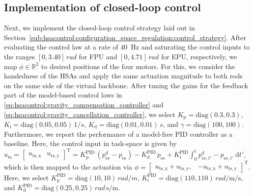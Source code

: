 \subsection{Implementation of closed-loop control}
Next, we implement the closed-loop control strategy laid out in Section~\ref{sub:hsacontrol:configuration_space_regulation:control_strategy}.
After evaluating the control law at a rate of \SI{40}{Hz} and saturating the control inputs to the ranges $[0, 3.40] \, \si{rad}$ for FPU and $[0, 4.71] \, \si{rad}$ for EPU, respectively, we map $\phi \in \mathbb{R}^2$ to desired positions of the four motors. For this, we consider the handedness of the \glspl{HSA} and apply the same actuation magnitude to both rods on the same side of the virtual backbone.
After tuning the gains for the feedback part of the model-based control laws in \eqref{eq:hsacontrol:gravity_compensation_controller} and \eqref{eq:hsacontrol:gravity_cancellation_controller}, we select $K_\mathrm{p} = \mathrm{diag}(0.3, 0.3)$, $K_\mathrm{i} = \mathrm{diag}(0.05, 0.05) \, \si{1 \per s}$, $K_\mathrm{d} = \mathrm{diag}(0.01, 0.01) \, \si{s}$, and $\gamma = \mathrm{diag}(100, 100)$. 
Furthermore, we report the performance of a model-free PID controller as a baseline. Here, the control input in task-space is given by $u_\mathrm{ts} = \begin{bmatrix}u_\mathrm{ts,x} & u_\mathrm{ts,y}\end{bmatrix}^\mathrm{T} = K_\mathrm{p}^\mathrm{PID} \, (p_\mathrm{ee}^\mathrm{d}-p_\mathrm{ee}) - K_\mathrm{d}^\mathrm{PID} \, \dot{p}_\mathrm{ee} + K_\mathrm{i}^\mathrm{PID} \int_0^t p_{\mathrm{ee},t'}^\mathrm{d} - p_{\mathrm{ee},t'} \: \mathrm{d}t'$, which is then mapped to the actuation via $\phi = \begin{bmatrix}
    u_\mathrm{ts,x}+u_\mathrm{ts,y}, & -u_\mathrm{ts,x}+u_\mathrm{ts,y}
\end{bmatrix}^\mathrm{T}$.
Here, we select $K_\mathrm{p}^\mathrm{PID} = \mathrm{diag}(10, 10) \, \si{rad \per m}$, $ K_\mathrm{i}^\mathrm{PID} = \mathrm{diag}(110, 110) \, \si{rad \per \meter \per \second}$, and $ K_\mathrm{d}^\mathrm{PID} = \mathrm{diag}(0.25, 0.25) \, \si{rad \, \second \per \meter}$.
\\

